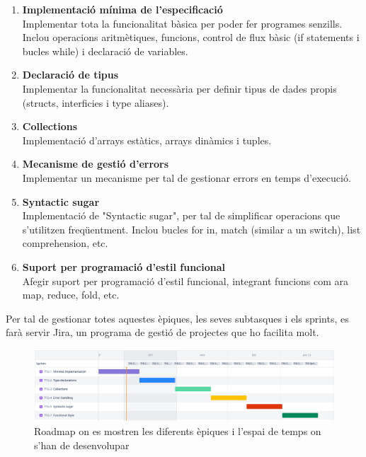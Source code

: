 ﻿\documentclass{article}
\begin{document}
\begin{enumerate}
    \item \textbf{Implementació mínima de l'especificació}\\
        Implementar tota la funcionalitat bàsica per poder fer programes senzills.
        Inclou operacions aritmètiques, funcions, control de flux bàsic (if
        statements i bucles while) i declaració de variables.

    \item \textbf{Declaració de tipus} \\
        Implementar la funcionalitat necessària per definir tipus de dades
        propis (structs, interficies i type aliases).

    \item \textbf{Collections}\\
        Implementació d'arrays estàtics, arrays dinàmics i tuples.

    \item \textbf{Mecanisme de gestió d'errors}\\
        Implementar un mecanisme per tal de gestionar errors en temps d'execució.

    \item \textbf{Syntactic sugar}\\
        Implementació de "Syntactic sugar", per tal de simplificar operacions
        que s'utilitzen freqüentment. Inclou bucles for in, match (similar a un
        switch), list comprehension, etc.

    \item \textbf{Suport per programació d'estil funcional}\\
        Afegir suport per programació d'estil funcional, integrant funcions com
        ara map, reduce, fold, etc.
\end{enumerate}

Per tal de gestionar totes aquestes èpiques, les seves subtasques i els sprints,
es farà servir Jira, un programa de gestió de projectes que ho facilita molt.

\begin{figure}
    \includegraphics[width=\linewidth]{roadmap}
    \caption{Roadmap on es mostren les diferents èpiques i l'espai de temps on s'han de desenvolupar}
\end{figure}
\end{document}
